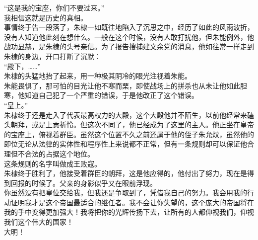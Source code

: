 \begin{multicols}{\theparacolNo}
“这是我的宝座，你们不要过来。”\\

我相信这就是历史的真相。\\

事情终于告一段落了，朱棣一如既往地陷入了沉思之中，经历了如此的风雨波折，没有人知道他此刻在想什么。一般在这个时候，没有人敢打扰他，但朱能例外，他战功显赫，是朱棣的头号亲信。为了报告搜捕建文余党的消息，他如往常一样走到朱棣的身边，开口打断了沉默：\\

“殿下，……”\\

朱棣的头猛地抬了起来，用一种极其阴冷的眼光注视着朱能。\\

朱能畏惧了，那可怕的目光让他不寒而栗，即使战场上的拼杀也从未让他如此胆寒，他知道自己犯了一个严重的错误，于是他改正了这个错误。\\

“皇上。”\\

朱棣终于还是走入了代表最高权力的大殿，这个大殿他并不陌生，以前他经常来磕头朝拜，或是上贡祈怜。但这次不同了，他已经成为了这里的主人。他正坐在皇帝的宝座上，俯视着群臣。虽然这个位置不久之前还属于他的侄子朱允炆，虽然他的即位无论从法律的实体性和程序性上来说都不正常，但有一条规则却可以保证他合理但不合法的占据这个地位。\\

这条规则的名字叫做成王败寇。\\

朱棣终于胜利了，他接受着群臣的朝拜，这是他应得的，他付出了努力，现在是得到回报的时候了。父亲的身影似乎又在眼前浮现。\\

你虽然没有把皇位交给我，但我还是争取到了，凭借我自己的努力。我会用我的行动证明我才是这个帝国最适合的继任者。我不会让你失望的，这个庞大的帝国将在我的手中变得更加强大！我将把你的光辉传扬下去，让所有的人都仰视我们，仰视我们这个伟大的国家！\\

大明！\\
\ifnum{}
	\end{multicols}
\fi